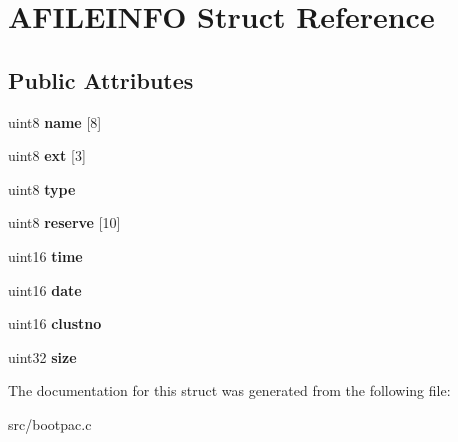 \hypertarget{struct_a_f_i_l_e_i_n_f_o}{}\section{A\+F\+I\+L\+E\+I\+N\+F\+O Struct Reference}
\label{struct_a_f_i_l_e_i_n_f_o}
\subsection*{Public Attributes}
\begin{DoxyCompactItemize}
\item 
\hypertarget{struct_a_f_i_l_e_i_n_f_o_ae07045186799dcde1b4b79bee1a6d95f}{}uint8 {\bfseries name} \mbox{[}8\mbox{]}\label{struct_a_f_i_l_e_i_n_f_o_ae07045186799dcde1b4b79bee1a6d95f}

\item 
\hypertarget{struct_a_f_i_l_e_i_n_f_o_ac16d67edd2f4c7154c534e4252c2baf5}{}uint8 {\bfseries ext} \mbox{[}3\mbox{]}\label{struct_a_f_i_l_e_i_n_f_o_ac16d67edd2f4c7154c534e4252c2baf5}

\item 
\hypertarget{struct_a_f_i_l_e_i_n_f_o_a4a960d87cc67a387023083177d969f1e}{}uint8 {\bfseries type}\label{struct_a_f_i_l_e_i_n_f_o_a4a960d87cc67a387023083177d969f1e}

\item 
\hypertarget{struct_a_f_i_l_e_i_n_f_o_a59c10eaa25082eac8f2fb93239e25521}{}uint8 {\bfseries reserve} \mbox{[}10\mbox{]}\label{struct_a_f_i_l_e_i_n_f_o_a59c10eaa25082eac8f2fb93239e25521}

\item 
\hypertarget{struct_a_f_i_l_e_i_n_f_o_a0ffc4aaaf219f4295f4a4810124ac9de}{}uint16 {\bfseries time}\label{struct_a_f_i_l_e_i_n_f_o_a0ffc4aaaf219f4295f4a4810124ac9de}

\item 
\hypertarget{struct_a_f_i_l_e_i_n_f_o_a05eb1152777b191090b776c8390b2326}{}uint16 {\bfseries date}\label{struct_a_f_i_l_e_i_n_f_o_a05eb1152777b191090b776c8390b2326}

\item 
\hypertarget{struct_a_f_i_l_e_i_n_f_o_aebf34ca6988095bfdc7f65c104561245}{}uint16 {\bfseries clustno}\label{struct_a_f_i_l_e_i_n_f_o_aebf34ca6988095bfdc7f65c104561245}

\item 
\hypertarget{struct_a_f_i_l_e_i_n_f_o_a2f9da1acb8f25e9749d071cbe78fedd0}{}uint32 {\bfseries size}\label{struct_a_f_i_l_e_i_n_f_o_a2f9da1acb8f25e9749d071cbe78fedd0}

\end{DoxyCompactItemize}


The documentation for this struct was generated from the following file\+:\begin{DoxyCompactItemize}
\item 
src/bootpac.\+c\end{DoxyCompactItemize}
